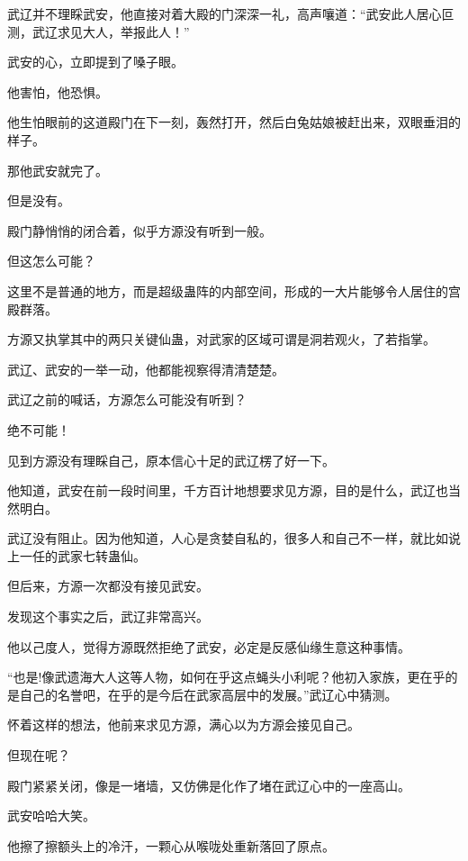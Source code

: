 
\begin{this_body}



武辽并不理睬武安，他直接对着大殿的门深深一礼，高声嚷道：“武安此人居心叵测，武辽求见大人，举报此人！”

武安的心，立即提到了嗓子眼。

他害怕，他恐惧。

他生怕眼前的这道殿门在下一刻，轰然打开，然后白兔姑娘被赶出来，双眼垂泪的样子。

那他武安就完了。

但是没有。

殿门静悄悄的闭合着，似乎方源没有听到一般。

但这怎么可能？

这里不是普通的地方，而是超级蛊阵的内部空间，形成的一大片能够令人居住的宫殿群落。

方源又执掌其中的两只关键仙蛊，对武家的区域可谓是洞若观火，了若指掌。

武辽、武安的一举一动，他都能视察得清清楚楚。

武辽之前的喊话，方源怎么可能没有听到？

绝不可能！

见到方源没有理睬自己，原本信心十足的武辽楞了好一下。

他知道，武安在前一段时间里，千方百计地想要求见方源，目的是什么，武辽也当然明白。

武辽没有阻止。因为他知道，人心是贪婪自私的，很多人和自己不一样，就比如说上一任的武家七转蛊仙。

但后来，方源一次都没有接见武安。

发现这个事实之后，武辽非常高兴。

他以己度人，觉得方源既然拒绝了武安，必定是反感仙缘生意这种事情。

“也是!像武遗海大人这等人物，如何在乎这点蝇头小利呢？他初入家族，更在乎的是自己的名誉吧，在乎的是今后在武家高层中的发展。”武辽心中猜测。

怀着这样的想法，他前来求见方源，满心以为方源会接见自己。

但现在呢？

殿门紧紧关闭，像是一堵墙，又仿佛是化作了堵在武辽心中的一座高山。

武安哈哈大笑。

他擦了擦额头上的冷汗，一颗心从喉咙处重新落回了原点。


\end{this_body}
